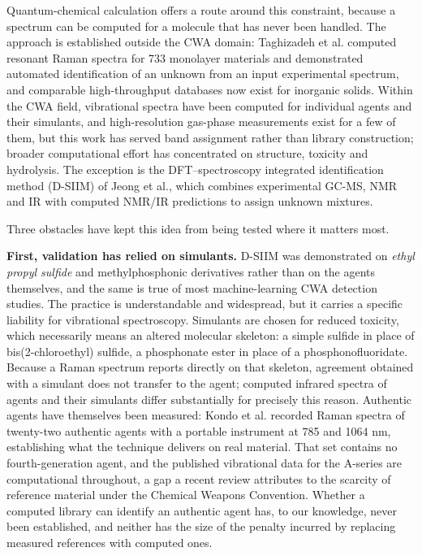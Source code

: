 \documentclass[review,12pt]{elsarticle}
\begin{document}
Quantum-chemical calculation offers a route around this constraint, because a spectrum can be computed for a molecule that has never been handled. The approach is established outside the CWA domain: Taghizadeh et al. computed resonant Raman spectra for 733 monolayer materials and demonstrated automated identification of an unknown from an input experimental spectrum,\cite{taghizadeh2020library} and comparable high-throughput databases now exist for inorganic solids.\cite{liang2019highthroughput} Within the CWA field, vibrational spectra have been computed for individual agents and their simulants,\cite{mott2012calculated,ewig1985abinitio,ault2004matrix} and high-resolution gas-phase measurements exist for a few of them,\cite{walker2001rotational,suenram2002fourier} but this work has served band assignment rather than library construction; broader computational effort has concentrated on structure, toxicity and hydrolysis.\cite{bhakhoa2019theoretical,jeong2019theoretical,imrit2020theoretical,otsuka2021theoretical} The exception is the DFT--spectroscopy integrated identification method (D-SIIM) of Jeong et al., which combines experimental GC-MS, NMR and IR with computed NMR/IR predictions to assign unknown mixtures.\cite{jeong2024dsiim}

Three obstacles have kept this idea from being tested where it matters most.

\textbf{First, validation has relied on simulants.} D-SIIM was demonstrated on \textit{ethyl propyl sulfide} and methylphosphonic derivatives rather than on the agents themselves,\cite{jeong2024dsiim} and the same is true of most machine-learning CWA detection studies. The practice is understandable and widespread,\cite{witkiewicz2018analysis} but it carries a specific liability for vibrational spectroscopy. Simulants are chosen for reduced toxicity, which necessarily means an altered molecular skeleton: a simple sulfide in place of bis(2-chloroethyl) sulfide, a phosphonate ester in place of a phosphonofluoridate. Because a Raman spectrum reports directly on that skeleton, agreement obtained with a simulant does not transfer to the agent; computed infrared spectra of agents and their simulants differ substantially for precisely this reason.\cite{mott2012calculated} Authentic agents have themselves been measured: Kondo et al. recorded Raman spectra of twenty-two authentic agents with a portable instrument at 785 and 1064 nm, establishing what the technique delivers on real material.\cite{kondo2018analysis} That set contains no fourth-generation agent, and the published vibrational data for the A-series are computational throughout,\cite{vieira2021electronic} a gap a recent review attributes to the scarcity of reference material under the Chemical Weapons Convention.\cite{cekovic2025detection} Whether a computed library can identify an authentic agent has, to our knowledge, never been established, and neither has the size of the penalty incurred by replacing measured references with computed ones.
\end{document}
